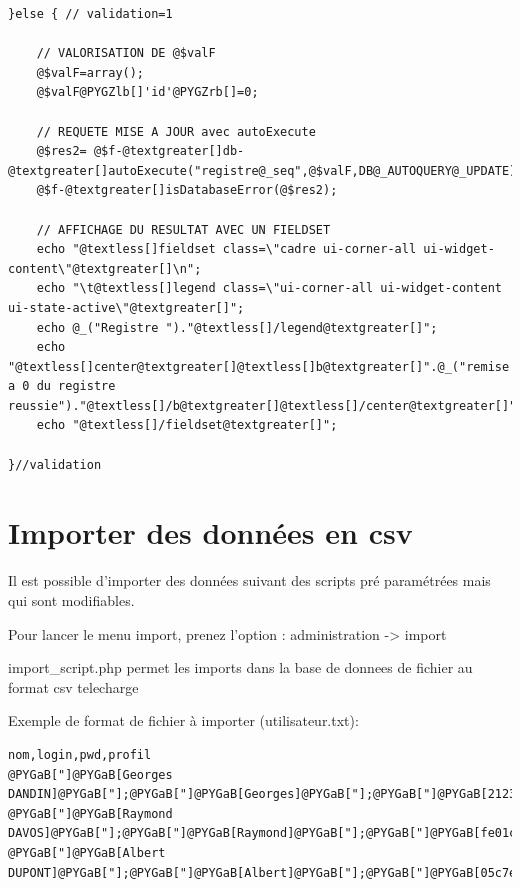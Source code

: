 \documentclass[letterpaper,10pt,french]{manual}
\begin{document}
\begin{Verbatim}[commandchars=@\[\]]
}else { // validation=1

    // VALORISATION DE @$valF
    @$valF=array();
    @$valF@PYGZlb[]'id'@PYGZrb[]=0;

    // REQUETE MISE A JOUR avec autoExecute
    @$res2= @$f-@textgreater[]db-@textgreater[]autoExecute("registre@_seq",@$valF,DB@_AUTOQUERY@_UPDATE);
    @$f-@textgreater[]isDatabaseError(@$res2);

    // AFFICHAGE DU RESULTAT AVEC UN FIELDSET
    echo "@textless[]fieldset class=\"cadre ui-corner-all ui-widget-content\"@textgreater[]\n";
    echo "\t@textless[]legend class=\"ui-corner-all ui-widget-content ui-state-active\"@textgreater[]";
    echo @_("Registre ")."@textless[]/legend@textgreater[]";
    echo "@textless[]center@textgreater[]@textless[]b@textgreater[]".@_("remise a 0 du registre reussie")."@textless[]/b@textgreater[]@textless[]/center@textgreater[]";
    echo "@textless[]/fieldset@textgreater[]";

}//validation
\end{Verbatim}

\resetcurrentobjects
\hypertarget{--doc-framework/import}{}

\hypertarget{import}{}\section{Importer des données en csv}

Il est possible d'importer des données suivant des scripts pré paramétrées mais qui sont
modifiables.

Pour lancer le menu import, prenez l'option : administration -\textgreater{} import

import\_script.php permet les imports dans la base de donnees de fichier au
format csv telecharge

Exemple de format de fichier à importer (utilisateur.txt):

\begin{Verbatim}[commandchars=@\[\]]
nom,login,pwd,profil
@PYGaB["]@PYGaB[Georges DANDIN]@PYGaB["];@PYGaB["]@PYGaB[Georges]@PYGaB["];@PYGaB["]@PYGaB[21232f297a57a5a743894a0e4a801fc3]@PYGaB["];@PYGaB["]@PYGaB[3]@PYGaB["]
@PYGaB["]@PYGaB[Raymond DAVOS]@PYGaB["];@PYGaB["]@PYGaB[Raymond]@PYGaB["];@PYGaB["]@PYGaB[fe01ce2a7fbac8fafaed7c982a04e229]@PYGaB["];@PYGaB["]@PYGaB[3]@PYGaB["]
@PYGaB["]@PYGaB[Albert DUPONT]@PYGaB["];@PYGaB["]@PYGaB[Albert]@PYGaB["];@PYGaB["]@PYGaB[05c7e24700502a079cdd88012b5a76d3]@PYGaB["];@PYGaB["]@PYGaB[6]@PYGaB["]
\end{Verbatim}
\end{document}
